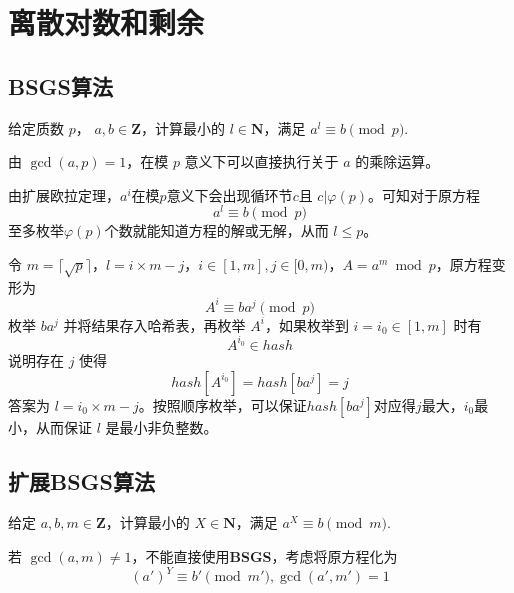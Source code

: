\documentclass[12pt,a4paper]{article}
\begin{document}
\newpage
\section{离散对数和剩余}
\subsection{BSGS算法}
\begin{mdframed}[leftline=true, linewidth=2pt, linecolor=gray]
	给定质数 $p$， $a,b\in \mathbf{Z}$，计算最小的 $l\in\mathbf{N}$，满足 $a^l \equiv b \pmod p$.
\end{mdframed}

由 $\gcd(a,p)=1$，在模 $p$ 意义下可以直接执行关于 $a$ 的乘除运算。

由扩展欧拉定理，$a^i$在模$p$意义下会出现循环节$c$且 $c|\varphi(p)$。可知对于原方程 \begin{equation*}
	a^l \equiv b \pmod p
\end{equation*}
至多枚举$\varphi(p)$个数就能知道方程的解或无解，从而 $l\leq p$。

令 $m=\lceil\sqrt{p}\rceil$，$l=i\times m-j$，$i\in[1,m],j\in[0,m)$，$A=a^m\bmod{p}$，原方程变形为 \begin{equation*}
	A^i\equiv ba^j\pmod{p}
\end{equation*}
枚举 $ba^j$ 并将结果存入哈希表，再枚举 $A^i$，如果枚举到 $i=i_0\in [1,m]$ 时有 
\begin{equation*}
	A^{i_0}\in hash
\end{equation*}
说明存在 $j$ 使得 \begin{equation*}
	hash[A^{i_0}]=hash[ba^j]=j
\end{equation*}
答案为 $l=i_0\times m-j$。按照顺序枚举，可以保证$hash[ba^j]$对应得$j$最大，$i_0$最小，从而保证 $l$ 是最小非负整数。

\subsection{扩展BSGS算法}
\begin{mdframed}[leftline=true, linewidth=2pt, linecolor=gray]
	给定 $a,b,m\in \mathbf{Z}$，计算最小的 $X\in\mathbf{N}$，满足 $a^X \equiv b \pmod m$.
\end{mdframed}

若 $\gcd(a,m)\ne1$，不能直接使用\textbf{BSGS}，考虑将原方程化为\begin{equation*}
	(a')^{Y}\equiv b'\pmod{m'},\gcd(a',m')=1
\end{equation*}
\end{document}
